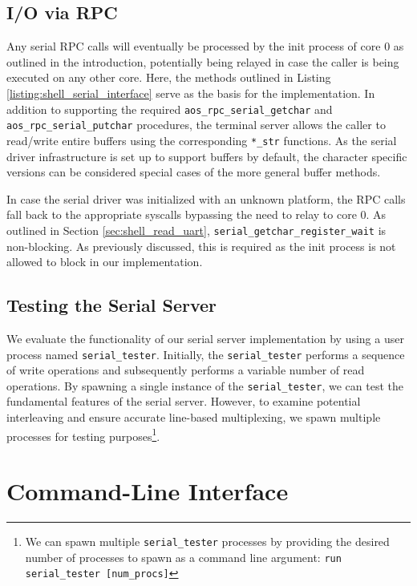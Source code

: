 \subsection{I/O via RPC} \label{sec:shell_io_via_rpc}

Any serial RPC calls will eventually be processed by the init process of core 0 as outlined in the introduction, potentially being relayed in case the caller is being executed on any other core. Here, the methods outlined in Listing \ref{listing:shell_serial_interface} serve as the basis for the implementation. In addition to supporting the required \texttt{aos\_rpc\_serial\_getchar}  and \texttt{aos\_rpc\_serial\_putchar} procedures, the terminal server allows the caller to read/write entire buffers using the corresponding \texttt{*\_str} functions. As the serial driver infrastructure is set up to support buffers by default, the character specific versions can be considered special cases of the more general buffer methods.

In case the serial driver was initialized with an unknown platform, the RPC calls fall back to the appropriate syscalls bypassing the need to relay to core 0. As outlined in Section \ref{sec:shell_read_uart}, \texttt{serial\_getchar\_register\_wait} is non-blocking. As previously discussed, this is required as the init process is not allowed to block in our implementation.

\subsection{Testing the Serial Server}

We evaluate the functionality of our serial server implementation by using a user process named \texttt{serial\_tester}. Initially, the \texttt{serial\_tester} performs a sequence of write operations and subsequently performs a variable number of read operations. By spawning a single instance of the \texttt{serial\_tester}, we can test the fundamental features of the serial server. However, to examine potential interleaving and ensure accurate line-based multiplexing, we spawn multiple processes for testing purposes\footnote{We can spawn multiple \texttt{serial\_tester} processes by providing the desired number of processes to spawn as a command line argument: \texttt{run serial\_tester [num\_procs]}}.

\section{Command-Line Interface}


